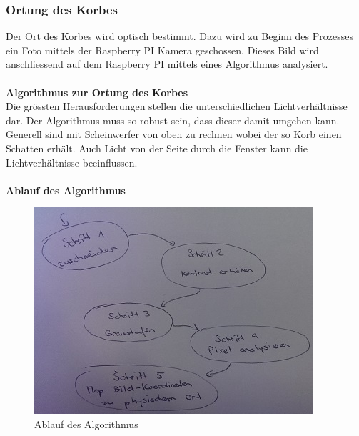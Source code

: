 \subsubsection{Ortung des Korbes}
Der Ort des Korbes wird optisch bestimmt. Dazu wird zu Beginn des Prozesses ein Foto mittels der Raspberry PI Kamera geschossen. Dieses Bild wird anschliessend auf dem Raspberry PI mittels eines Algorithmus analysiert.\\
\\
\textbf{Algorithmus zur Ortung des Korbes}\\
Die grössten Herausforderungen stellen die unterschiedlichen Lichtverhältnisse dar. Der Algorithmus muss so robust sein, dass dieser damit umgehen kann. Generell sind mit Scheinwerfer von oben zu rechnen wobei der so Korb einen Schatten erhält. Auch Licht von der Seite durch die Fenster kann die Lichtverhältnisse beeinflussen.\\
\\
\textbf{Ablauf des Algorithmus}\\
\begin{figure}[h!]
	\centering
	\includegraphics[scale=0.75]{../../fig/ablauf-algorithmus-orts-erkennung.jpg}
	\caption{Ablauf des Algorithmus}
\end{figure}

